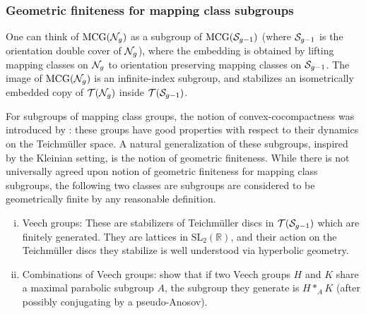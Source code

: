 


\subsubsection*{Geometric finiteness for mapping class subgroups}

One can think of $\mathrm{MCG}(\mathcal{N}_g)$ as a subgroup of $\mathrm{MCG}(\mathcal{S}_{g-1})$ (where $\mathcal{S}_{g-1}$ is the orientation double cover of $\mathcal{N}_g$), where the embedding is obtained by lifting mapping classes on $\mathcal{N}_g$ to orientation preserving mapping classes on $\mathcal{S}_{g-1}$.
The image of $\mathrm{MCG}(\mathcal{N}_g)$ is an infinite-index subgroup, and stabilizes an isometrically embedded copy of $\mathcal{T}(\mathcal{N}_g)$ inside $\mathcal{T}(\mathcal{S}_{g-1})$.

For subgroups of mapping class groups, the notion of convex-cocompactness was introduced by \textcite{farb2002convex}: these groups have good properties with respect to their dynamics on the Teichmüller space.
A natural generalization of these subgroups, inspired by the Kleinian setting, is the notion of geometric finiteness.
While there is not universally agreed upon notion of geometric finiteness for mapping class subgroups, the following two classes are subgroups are considered to be geometrically finite by any reasonable definition.

\begin{enumerate}[(i)]
\item Veech groups: These are stabilizers of Teichmüller discs in $\mathcal{T}(\mathcal{S}_{g-1})$ which are finitely generated.
  They are lattices in $\mathrm{SL}_2(\mathbb{R})$, and their action on the Teichmüller discs they stabilize is well understood via hyperbolic geometry.
\item Combinations of Veech groups: \textcite{leininger2006combination} show that if two Veech groups $H$ and $K$ share a maximal parabolic subgroup $A$, the subgroup they generate is $H \ast_A K$ (after possibly conjugating by a pseudo-Anosov).
\end{enumerate}

